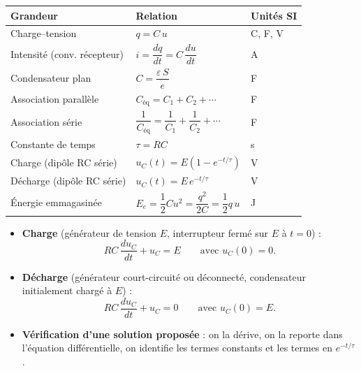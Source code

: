 \documentclass[11pt]{article}
\begin{document}
\begin{propriete}
\begin{center}
\begin{tabularx}{\linewidth}{|l|X|l|}
\hline
\rowcolor{popblueL} \textbf{Grandeur} & \textbf{Relation} & \textbf{Unités SI} \\
\hline
Charge--tension & $q = C\,u$ & C, F, V \\
\hline
Intensité (conv. récepteur) & $i = \dfrac{dq}{dt} = C\,\dfrac{du}{dt}$ & A \\
\hline
Condensateur plan & $C = \dfrac{\varepsilon\, S}{e}$ & F \\
\hline
Association parallèle & $C_{\text{éq}} = C_1 + C_2 + \cdots$ & F \\
\hline
Association série & $\dfrac{1}{C_{\text{éq}}} = \dfrac{1}{C_1} + \dfrac{1}{C_2} + \cdots$ & F \\
\hline
Constante de temps & $\tau = RC$ & s \\
\hline
Charge (dipôle RC série) & $u_C(t) = E\left(1 - e^{-t/\tau}\right)$ & V \\
\hline
Décharge (dipôle RC série) & $u_C(t) = E\,e^{-t/\tau}$ & V \\
\hline
Énergie emmagasinée & $E_e = \dfrac{1}{2}C u^2 = \dfrac{q^2}{2C} = \dfrac{1}{2}q\,u$ & J \\
\hline
\end{tabularx}
\end{center}
\end{propriete}

\begin{propriete}
\begin{itemize}
  \item \textbf{Charge} (générateur de tension $E$, interrupteur fermé sur $E$ à $t=0$) : 
  \[ RC\,\dfrac{du_C}{dt} + u_C = E \qquad\text{avec } u_C(0)=0. \]
  \item \textbf{Décharge} (générateur court-circuité ou déconnecté, condensateur initialement chargé à $E$) : 
  \[ RC\,\dfrac{du_C}{dt} + u_C = 0 \qquad\text{avec } u_C(0)=E. \]
  \item \textbf{Vérification d'une solution proposée} : on la dérive, on la reporte dans l'équation différentielle, on identifie les termes constants et les termes en $e^{-t/\tau}$.
\end{itemize}
\end{propriete}
\end{document}
